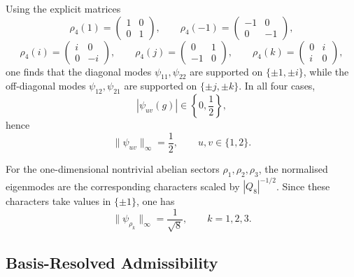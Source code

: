\documentclass[11pt,a4paper]{article}
\begin{document}
    Using the explicit matrices
    \begin{equation}
      \rho_4(1)=
      \begin{pmatrix}
        1 & 0 \\
        0 & 1
      \end{pmatrix},
      \qquad
      \rho_4(-1)=
      \begin{pmatrix}
        -1 & 0 \\
        0 & -1
      \end{pmatrix},
    \end{equation}
    \begin{equation}
      \rho_4(i)=
      \begin{pmatrix}
        i & 0 \\
        0 & -i
      \end{pmatrix},
      \qquad
      \rho_4(j)=
      \begin{pmatrix}
        0 & 1 \\
        -1 & 0
      \end{pmatrix},
      \qquad
      \rho_4(k)=
      \begin{pmatrix}
        0 & i \\
        i & 0
      \end{pmatrix},
    \end{equation}
    one finds that the diagonal modes $\psi_{11}, \psi_{22}$ are supported on
    $\{\pm 1, \pm i\}$, while the off-diagonal modes $\psi_{12}, \psi_{21}$ are
    supported on $\{\pm j, \pm k\}$.
    In all four cases,
    \begin{equation}
      |\psi_{uv}(g)| \in \left\{0,\frac{1}{2}\right\},
    \end{equation}
    hence
    \begin{equation}
      \|\psi_{uv}\|_\infty = \frac{1}{2},
      \qquad
      u,v \in \{1,2\}.
    \end{equation}

    For the one-dimensional nontrivial abelian sectors $\rho_1, \rho_2, \rho_3$,
    the normalised eigenmodes are the corresponding characters scaled by
    $|Q_8|^{-1/2}$.
    Since these characters take values in $\{\pm 1\}$, one has
    \begin{equation}
      \|\psi_{\rho_k}\|_\infty = \frac{1}{\sqrt{8}},
      \qquad
      k = 1,2,3.
    \end{equation}

  \subsection{Basis-Resolved Admissibility}
\end{document}
